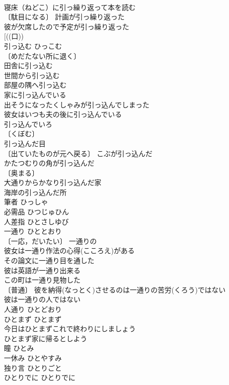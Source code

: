 \documentclass[8pt]{extreport}
\begin{document}
\begin{CJK}{UTF8}{min}
\\	寝床（ねどこ）に引っ繰り返って本を読む 
\\	〔駄目になる〕 計画が引っ繰り返った 
\\	彼が欠席したので予定が引っ繰り返った 
\\	[((口))
\\	引っ込む	ひっこむ	
\\	〔めだたない所に退く〕
\\	田舎に引っ込む 
\\	世間から引っ込む 
\\	部屋の隅へ引っ込む 
\\	家に引っ込んでいる 
\\	出そうになったくしゃみが引っ込んでしまった 
\\	彼女はいつも夫の後に引っ込んでいる 
\\	引っ込んでいろ 
\\	〔くぼむ〕
\\	引っ込んだ目 
\\	〔出ていたものが元へ戻る〕 こぶが引っ込んだ 
\\	かたつむりの角が引っ込んだ 
\\	〔奥まる〕
\\	大通りからかなり引っ込んだ家 
\\	海岸の引っ込んだ所 
\\	筆者	ひっしゃ	
\\	必需品	ひつじゅひん	
\\	人差指	ひとさしゆび	
\\	一通り	ひととおり	
\\	〔一応，だいたい〕 一通りの 
\\	彼女は一通り作法の心得(こころえ)がある 
\\	その論文に一通り目を通した 
\\	彼は英語が一通り出来る 
\\	この町は一通り見物した 
\\	〔普通〕 彼を納得(なっとく)させるのは一通りの苦労(くろう)ではない 
\\	彼は一通りの人ではない 
\\	人通り	ひとどおり	
\\	ひとまず	ひとまず	
\\	今日はひとまずこれで終わりにしましょう 
\\	ひとまず家に帰るとしよう 
\\	瞳	ひとみ	
\\	一休み	ひとやすみ	
\\	独り言	ひとりごと	
\\	ひとりでに	ひとりでに	

\end{CJK}
\end{document}
